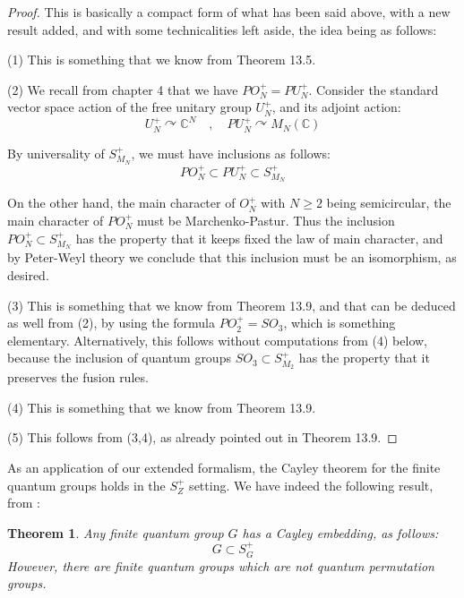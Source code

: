 \documentclass[12pt]{amsbook}
\newtheorem{theorem}{Theorem}[chapter]
\begin{document}
\begin{proof}
This is basically a compact form of what has been said above, with a new result added, and with some technicalities left aside, the idea being as follows:

\medskip

(1) This is something that we know from Theorem 13.5.

\medskip

(2) We recall from chapter 4 that we have $PO_N^+=PU_N^+$. Consider the standard vector space action of the free unitary group $U_N^+$, and its adjoint action:
$$U_N^+\curvearrowright\mathbb C^N\quad,\quad 
PU_N^+\curvearrowright M_N(\mathbb C)$$

By universality of $S_{M_N}^+$, we must have inclusions as follows:
$$PO_N^+\subset PU_N^+\subset S_{M_N}^+$$

On the other hand, the main character of $O_N^+$ with $N\geq2$ being semicircular, the main character of $PO_N^+$ must be Marchenko-Pastur. Thus the inclusion $PO_N^+\subset S_{M_N}^+$ has the property that it keeps fixed the law of main character, and by Peter-Weyl theory we conclude that this inclusion must be an isomorphism, as desired.

\medskip

(3) This is something that we know from Theorem 13.9, and that can be deduced as well from (2), by using the formula $PO_2^+=SO_3$, which is something elementary. Alternatively, this follows without computations from (4) below, because the inclusion of quantum groups $SO_3\subset S_{M_2}^+$ has the property that it preserves the fusion rules.

\medskip

(4) This is something that we know from Theorem 13.9.

\medskip

(5) This follows from (3,4), as already pointed out in Theorem 13.9.
\end{proof}

As an application of our extended formalism, the Cayley theorem for the finite quantum groups holds in the $S_Z^+$ setting. We have indeed the following result, from \cite{bbn}:

\begin{theorem}
Any finite quantum group $G$ has a Cayley embedding, as follows:
$$G\subset S_G^+$$
However, there are finite quantum groups which are not quantum permutation groups.
\end{theorem}
\end{document}
